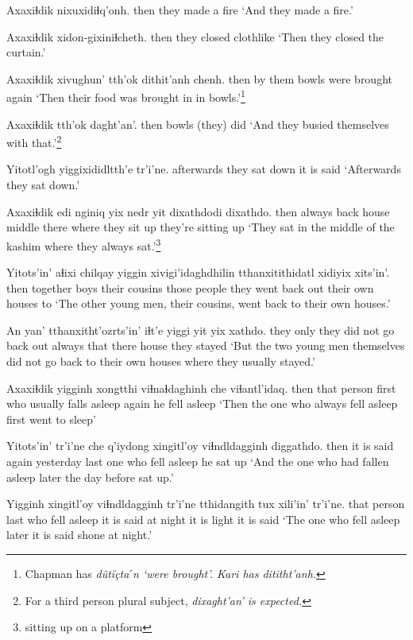 \documentclass[12pt]{article}
\begin{document}
\gll Axaxiɬdik nixuxidiɬq'onh.
then  {they made a fire}
\glt `And they made a fire.'
\glend

\gll Axaxiɬdik xidon-gixiniɬcheth.
then  {they closed clothlike}
\glt `Then they closed the curtain.'
\glend

\gll Axaxiɬdik xivughun' tth'ok  dithit'anh chenh.
then  {by them} bowls  {were brought} again
\glt `Then their food was brought in in bowls.'\footnote{Chapman has \em d\^ut\u{i}\c{c}taˊn \em `were brought'. Kari has \em dititht'anh.}
\glend

\gll Axaxiɬdik tth'ok  daght'an'.
then  bowls  {(they) did}
\glt `And they busied themselves with that.'\footnote{For a third person plural subject, \em dixaght'an' \em is expected.}
\glend

\gll Yitotl'ogh yiggixididltth'e tr'i'ne.
afterwards {they sat down} {it is said}
\glt `Afterwards they sat down.'
\glend

\gll Axaxiɬdik edi  nginiq yix nedr  yit dixathdodi dixathdo.
then  always  back  house middle  there {where they sit up} {they're sitting up}
\glt `They sat in the middle of the kashim where they always sat.'\footnote{sitting up on a platform}
\glend

\gll Yitots'in' aɬixi  chilqay yiggin xivigi'idaghdhilin tthanxitithidatl xidiyix xits'in'.
then  together boys {their cousins} {those people} {they went back out} {their own houses} to
\glt `The other young men, their cousins, went back to their own houses.'
\glend

\gll An yan' tthanxitht'ozrts'in' iɬt'e  yiggi yit yix xathdo.
they  only {they did not go back out}  always  that there house {they stayed}
\glt `But the two young men themselves did not go back to their own houses where they usually stayed.'
\glend

\gll Axaxiɬdik yigginh xongtthi viɬnaɬdaghinh   che viɬantl'idaq.
then  {that person} first  {who usually falls asleep} again {he fell asleep}
\glt `Then the one who always fell asleep first went to sleep'
\glend

\gll Yitots'in' tr'i'ne che q'iydong xingitl'oy viɬndldagginh diggathdo.
then  {it is said} again yesterday {last one} {who fell asleep} {he sat up}
\glt `And the one who had fallen asleep later the day before sat up.'
\glend

\gll Yigginh xingitl'oy viɬndldagginh tr'i'ne {tthidangith tux} xili'in' tr'i'ne.
{that person} last  {who fell asleep} {it is said} {at night} {it is light} {it is said}
\glt `The one who fell asleep later it is said shone at night.'
\glend
\end{document}
